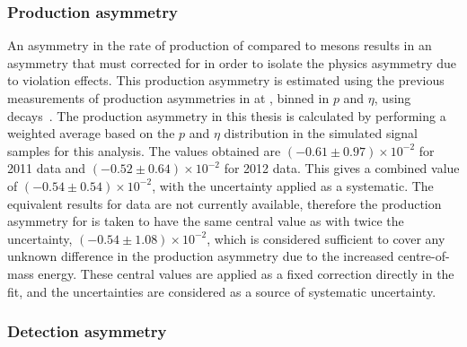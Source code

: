 \subsubsection{Production asymmetry}

An asymmetry in the rate of production of \Bp compared to \Bm mesons results in an asymmetry that must corrected for in order to isolate the physics asymmetry due to \CP violation effects. This \Bpm production asymmetry is estimated using the previous measurements of production asymmetries in \runone at \lhcb, binned in $p$ and $\eta$, using \decay{\Bp}{\Dzb\pip} decays~\cite{LHCb-PAPER-2016-054}. The production asymmetry in this thesis is calculated by performing a weighted average based on the $p$ and $\eta$ distribution in the simulated signal samples for this analysis. The values obtained are $(-0.61 \pm 0.97) \times 10^{-2}$ for 2011 data and $(-0.52 \pm 0.64) \times 10^{-2}$ for 2012 data. This gives a combined \runone value of $(-0.54 \pm 0.54) \times 10^{-2}$, with the uncertainty applied as a systematic. The equivalent results for \runtwo data are not currently available, therefore the production asymmetry for \runtwo is taken to have the same central value as \runone with twice the uncertainty, $(-0.54 \pm 1.08) \times 10^{-2}$, which is considered sufficient to cover any unknown difference in the production asymmetry due to the increased centre-of-mass energy. These central values are applied as a fixed correction directly in the \CP fit, and the uncertainties are considered as a source of systematic uncertainty.

\subsubsection{Detection asymmetry}

